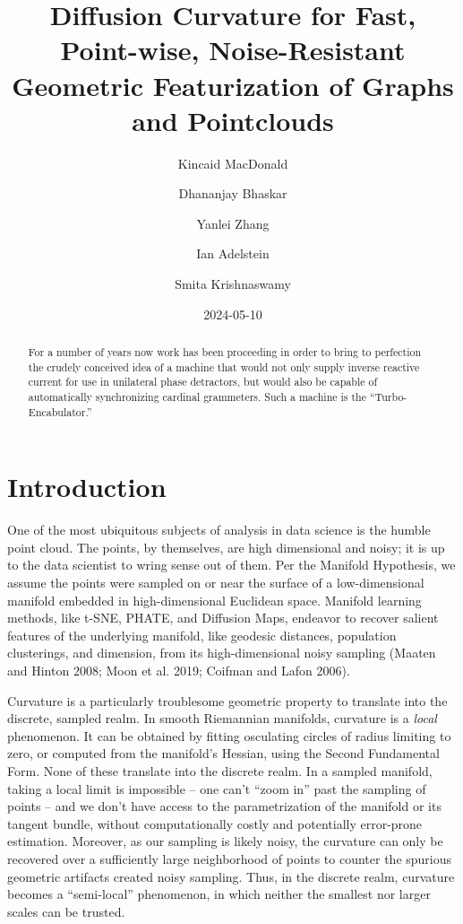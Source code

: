 \documentclass[
  letterpaper,
  DIV=11,
  numbers=noendperiod]{scrartcl}
\title{Diffusion Curvature for Fast, Point-wise, Noise-Resistant
Geometric Featurization of Graphs and Pointclouds}
\author{Kincaid MacDonald \and Dhananjay Bhaskar \and Yanlei
Zhang \and Ian Adelstein \and Smita Krishnaswamy}
\date{2024-05-10}
\theoremstyle{plain}
\theoremstyle{plain}
\theoremstyle{definition}
\theoremstyle{definition}
\theoremstyle{remark}
\begin{document}
\maketitle
\begin{abstract}
For a number of years now work has been proceeding in order to bring to
perfection the crudely conceived idea of a machine that would not only
supply inverse reactive current for use in unilateral phase detractors,
but would also be capable of automatically synchronizing cardinal
grammeters. Such a machine is the ``Turbo-Encabulator.''
\end{abstract}

\section{Introduction}\label{introduction}

One of the most ubiquitous subjects of analysis in data science is the
humble point cloud. The points, by themselves, are high dimensional and
noisy; it is up to the data scientist to wring sense out of them. Per
the Manifold Hypothesis, we assume the points were sampled on or near
the surface of a low-dimensional manifold embedded in high-dimensional
Euclidean space. Manifold learning methods, like t-SNE, PHATE, and
Diffusion Maps, endeavor to recover salient features of the underlying
manifold, like geodesic distances, population clusterings, and
dimension, from its high-dimensional noisy sampling (Maaten and Hinton
2008; Moon et al. 2019; Coifman and Lafon 2006).

Curvature is a particularly troublesome geometric property to translate
into the discrete, sampled realm. In smooth Riemannian manifolds,
curvature is a \emph{local} phenomenon. It can be obtained by fitting
osculating circles of radius limiting to zero, or computed from the
manifold's Hessian, using the Second Fundamental Form. None of these
translate into the discrete realm. In a sampled manifold, taking a local
limit is impossible -- one can't ``zoom in'' past the sampling of points
-- and we don't have access to the parametrization of the manifold or
its tangent bundle, without computationally costly and potentially
error-prone estimation. Moreover, as our sampling is likely noisy, the
curvature can only be recovered over a sufficiently large neighborhood
of points to counter the spurious geometric artifacts created noisy
sampling. Thus, in the discrete realm, curvature becomes a
``semi-local'' phenomenon, in which neither the smallest nor larger
scales can be trusted.
\end{document}
